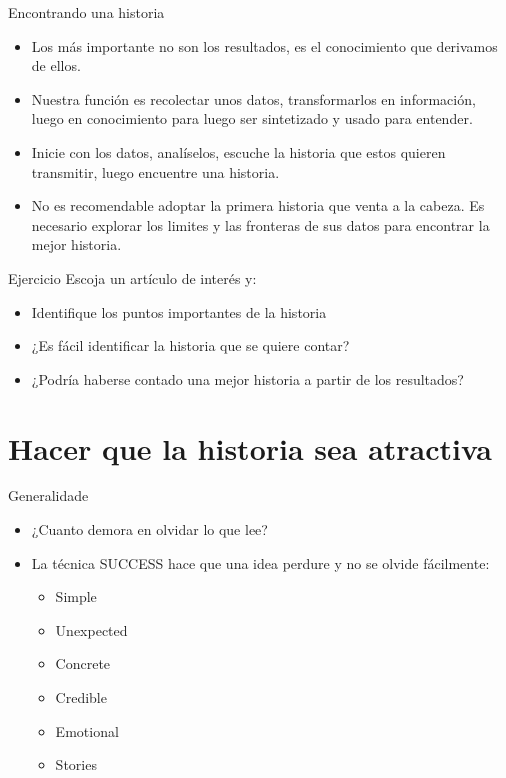\documentclass[
10pt,
aspectratio=169,
]{beamer}
\begin{document}
\begin{frame}[c]{Encontrando una historia}
\begin{itemize}
\item Los m\'as importante no son los resultados, es el conocimiento que derivamos de ellos.
\item Nuestra funci\'on es recolectar unos datos, transformarlos en informaci\'on, luego en conocimiento para luego ser sintetizado y usado para entender.
\item Inicie con los datos, anal\'iselos, escuche la historia que estos quieren transmitir, luego encuentre una historia.
\item No es recomendable adoptar la primera historia que venta a la cabeza. Es necesario explorar los limites y las fronteras de sus datos para encontrar la mejor historia. 
\end{itemize}
\end{frame}

\begin{frame}[c]{Ejercicio}
Escoja un art\'iculo de inter\'es y:
\begin{itemize}
\item Identifique los puntos importantes de la historia 
\item ¿Es f\'acil identificar la historia que se quiere contar?
\item ¿Podr\'ia haberse contado una mejor historia a partir de los resultados?
\end{itemize}
\end{frame}


\section{Hacer que la historia sea atractiva}

\begin{frame}[c]{Generalidade}
\begin{itemize}
\item ¿Cuanto demora en olvidar lo que lee?
\item La t\'ecnica \alert{SUCCESS} hace que una idea perdure y no se olvide f\'acilmente:
\begin{itemize}
\item \alert{S}imple
\item \alert{U}nexpected
\item \alert{C}oncrete
\item \alert{C}redible
\item \alert{E}motional
\item \alert{S}tories
\end{itemize}
\end{itemize}
\end{frame}
\end{document}
